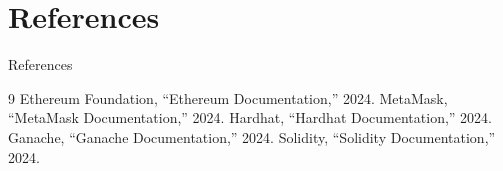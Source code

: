\documentclass{beamer}
\begin{document}
\section{References}
\begin{frame}{References}
  \begin{thebibliography}{9}
     Ethereum Foundation, ``Ethereum Documentation,'' 2024.
     MetaMask, ``MetaMask Documentation,'' 2024.
     Hardhat, ``Hardhat Documentation,'' 2024.
     Ganache, ``Ganache Documentation,'' 2024.
     Solidity, ``Solidity Documentation,'' 2024.
  \end{thebibliography}
\end{frame}

\begin{frame}
  \frametitle{}
  \begin{center}
  \end{center}
\end{frame}
\end{document}
